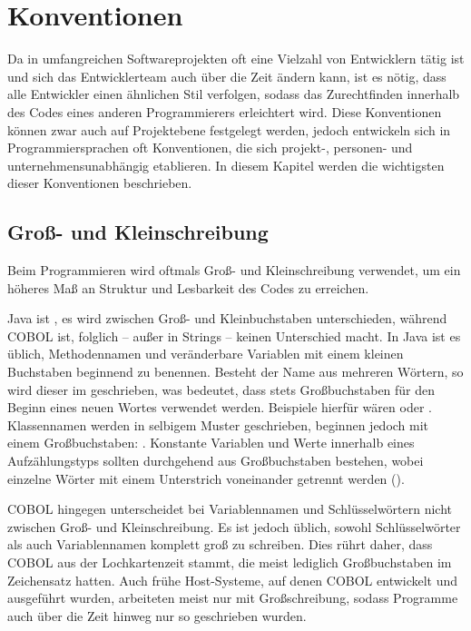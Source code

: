 \section{Konventionen}
Da in umfangreichen Softwareprojekten oft eine Vielzahl von Entwicklern tätig ist und sich das Entwicklerteam auch über die Zeit ändern kann, ist es nötig, dass alle Entwickler einen ähnlichen Stil verfolgen, sodass das Zurechtfinden innerhalb des Codes eines anderen Programmierers erleichtert wird. Diese Konventionen können zwar auch auf Projektebene festgelegt werden, jedoch entwickeln sich in Programmiersprachen oft Konventionen, die sich projekt-, personen- und unternehmensunabhängig etablieren. In diesem Kapitel werden die wichtigsten dieser Konventionen beschrieben.

\subsection{Groß- und Kleinschreibung}
Beim Programmieren wird oftmals Groß- und Kleinschreibung verwendet, um ein höheres Maß an Struktur und Lesbarkeit des Codes zu erreichen.

Java ist , \dahe  es wird zwischen Groß- und Kleinbuchstaben unterschieden, während COBOL  ist, folglich -- außer in Strings -- keinen Unterschied macht. In Java ist es üblich, Methodennamen und veränderbare Variablen mit einem kleinen Buchstaben beginnend zu benennen. Besteht der Name aus mehreren Wörtern, so wird dieser im  geschrieben, was bedeutet, dass stets Großbuchstaben für den Beginn eines neuen Wortes verwendet werden. Beispiele hierfür wären  oder . Klassennamen werden in selbigem Muster geschrieben, beginnen jedoch mit einem Großbuchstaben: . Konstante Variablen und Werte innerhalb eines Aufzählungstyps sollten durchgehend aus Großbuchstaben bestehen, wobei einzelne Wörter mit einem Unterstrich voneinander getrennt werden (). 

COBOL hingegen unterscheidet bei Variablennamen und Schlüsselwörtern nicht zwischen Groß- und Kleinschreibung. Es ist jedoch üblich, sowohl Schlüsselwörter als auch Variablennamen komplett groß zu schreiben. Dies rührt daher, dass COBOL aus der Lochkartenzeit stammt, die meist lediglich Großbuchstaben im Zeichensatz hatten. Auch frühe Host-Systeme, auf denen COBOL entwickelt und ausgeführt wurden, arbeiteten meist nur mit Großschreibung, sodass Programme auch über die Zeit hinweg nur so geschrieben wurden.


